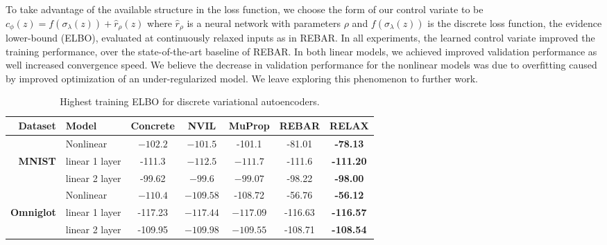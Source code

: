 \documentclass{article}
\newcommand{\E}{\mathbb{E}}
\newcommand{\PT}{\frac{\partial}{\partial \theta}}
\newcommand{\PP}[1]{\frac{\partial}{\partial #1}}
\begin{document}
To take advantage of the available structure in the loss function, we choose the form of our control variate to be $c_\phi(z) = f(\sigma_\lambda(z))+  \hat{r}_\rho(z)$ where $\hat{r}_\rho$ is a neural network with parameters $\rho$ and $f(\sigma_\lambda(z))$ is the discrete loss function, the evidence lower-bound (ELBO), evaluated at continuously relaxed inputs as in REBAR.  
%
In all experiments, the learned control variate improved the training performance, over the state-of-the-art baseline of REBAR. In both linear models, we achieved improved validation performance as well increased convergence speed. We believe the decrease in validation performance for the nonlinear models was due to overfitting caused by improved optimization of an under-regularized model. We leave exploring this phenomenon to further work. 

\begin{table}[h]
\centering
\begin{tabular}{r l | c c c c c} 
Dataset & Model & Concrete & NVIL & MuProp  & REBAR & RELAX\\\midrule 
               & Nonlinear & $-102.2$ & $-101.5$ & -101.1  &  -81.01 &  \textbf{-78.13} \\
\textbf{MNIST} & linear 1 layer  &-111.3 & $-112.5$ & $-111.7$  & -111.6 & \textbf{-111.20} \\ 
               & linear 2 layer  &-99.62 & $-99.6$ & $-99.07$   & -98.22 & \textbf{-98.00} \\
\midrule
               & Nonlinear  & $-110.4$  & $-109.58$ & -108.72  & -56.76 & \textbf{-56.12} \\
\textbf{Omniglot} & linear 1 layer &-117.23 & $-117.44$ & $-117.09$   & -116.63 & \textbf{-116.57} \\ 
                  & linear 2 layer &-109.95 & $-109.98$ & $-109.55$  & -108.71 & \textbf{-108.54}
\end{tabular}
\caption{Highest training ELBO for discrete variational autoencoders.}
\label{tab:vae tr}
\end{table}




\end{document}
